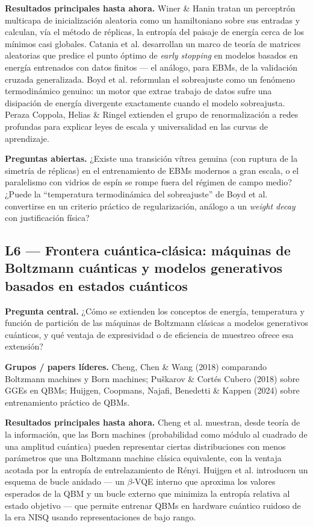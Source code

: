 \documentclass[12pt]{article}
\begin{document}
\textbf{Resultados principales hasta ahora.} Winer \& Hanin tratan un perceptrón multicapa de inicialización aleatoria como un hamiltoniano sobre sus entradas y calculan, vía el método de réplicas, la entropía del paisaje de energía cerca de los mínimos casi globales. Catania et al. desarrollan un marco de teoría de matrices aleatorias que predice el punto óptimo de \emph{early stopping} en modelos basados en energía entrenados con datos finitos --- el análogo, para EBMs, de la validación cruzada generalizada. Boyd et al. reformulan el sobreajuste como un fenómeno termodinámico genuino: un motor que extrae trabajo de datos sufre una disipación de energía divergente exactamente cuando el modelo sobreajusta. Peraza Coppola, Helias \& Ringel extienden el grupo de renormalización a redes profundas para explicar leyes de escala y universalidad en las curvas de aprendizaje.

\textbf{Preguntas abiertas.} ¿Existe una transición vítrea genuina (con ruptura de la simetría de réplicas) en el entrenamiento de EBMs modernos a gran escala, o el paralelismo con vidrios de espín se rompe fuera del régimen de campo medio? ¿Puede la ``temperatura termodinámica del sobreajuste'' de Boyd et al. convertirse en un criterio práctico de regularización, análogo a un \emph{weight decay} con justificación física?

\subsection{L6 --- Frontera cuántica-clásica: máquinas de Boltzmann cuánticas y modelos generativos basados en estados cuánticos}

\textbf{Pregunta central.} ¿Cómo se extienden los conceptos de energía, temperatura y función de partición de las máquinas de Boltzmann clásicas a modelos generativos cuánticos, y qué ventaja de expresividad o de eficiencia de muestreo ofrece esa extensión?

\textbf{Grupos / papers líderes.} Cheng, Chen \& Wang (2018) comparando Boltzmann machines y Born machines; Puškarov \& Cortés Cubero (2018) sobre GGEs en QBMs; Huijgen, Coopmans, Najafi, Benedetti \& Kappen (2024) sobre entrenamiento práctico de QBMs.

\textbf{Resultados principales hasta ahora.} Cheng et al. muestran, desde teoría de la información, que las Born machines (probabilidad como módulo al cuadrado de una amplitud cuántica) pueden representar ciertas distribuciones con menos parámetros que una Boltzmann machine clásica equivalente, con la ventaja acotada por la entropía de entrelazamiento de Rényi. Huijgen et al. introducen un esquema de bucle anidado --- un $\beta$-VQE interno que aproxima los valores esperados de la QBM y un bucle externo que minimiza la entropía relativa al estado objetivo --- que permite entrenar QBMs en hardware cuántico ruidoso de la era NISQ usando representaciones de bajo rango.
\end{document}
